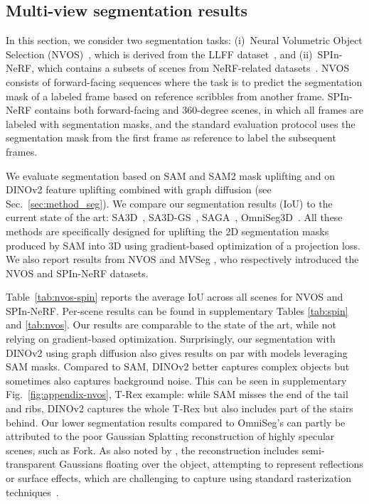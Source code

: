 \subsection{Multi-view segmentation results}
\label{sec:exp-seg}

 In this section, we consider two segmentation tasks: (i)~Neural Volumetric Object Selection (NVOS)~\cite{ren2022nvos}, which is derived from the LLFF dataset~\citep{mildenhall2019llff}, and (ii)~SPIn-NeRF, which contains a subsets of scenes from NeRF-related datasets~\citep{knapitsch2017tanks, mildenhall2019llff, mildenhall2021nerf, yen2022nerfsupervision, fridovich2022plenoxels}.
%
NVOS consists of forward-facing sequences where the task is to predict the segmentation mask of a labeled frame based on reference scribbles from another frame. 
SPIn-NeRF contains both forward-facing and 360-degree scenes, in which all frames are labeled with segmentation masks, and the standard evaluation protocol uses the segmentation mask from the first frame as reference to label the subsequent frames.

We evaluate segmentation based on SAM and SAM2 mask uplifting and on DINOv2 feature uplifting combined with graph diffusion (see Sec.~\ref{sec:method_seg}). 
%
We compare our segmentation results (IoU) to the current state of the art: SA3D~\citep{cen2023segmentNeRF}, SA3D-GS~\citep{cen2023segmentGS}, SAGA~\citep{cen2023saga}, OmniSeg3D~\citep{ying2023omniseg3d}. All these methods are specifically designed for uplifting the 2D segmentation masks produced by SAM into 3D using gradient-based optimization of a projection loss. We also report results from NVOS \citep{ren2022nvos} and MVSeg \citep{yen2022nerfsupervision}, who respectively introduced the NVOS and SPIn-NeRF datasets.

 Table~\ref{tab:nvos-spin} reports the average IoU across all scenes for NVOS and SPIn-NeRF. Per-scene results can be found in supplementary Tables \ref{tab:spin} and \ref{tab:nvos}.
Our results are comparable to the state of the art, while not relying on gradient-based optimization. 
Surprisingly, our segmentation with DINOv2 using graph diffusion also gives results on par with models leveraging SAM masks. Compared to SAM, DINOv2 better captures complex objects but sometimes also captures background noise. This can be seen in supplementary Fig.~\ref{fig:appendix-nvos}, T-Rex example: while SAM misses the end of the tail and ribs, DINOv2 captures the whole T-Rex but also includes part of the stairs behind.
Our lower segmentation results compared to OmniSeg's can partly be attributed to the poor Gaussian Splatting reconstruction of highly specular scenes, such as Fork. As also noted by \cite{cen2023saga}, the reconstruction includes semi-transparent Gaussians floating over the object, attempting to represent reflections or surface effects, which are challenging to capture using standard rasterization techniques~\citep{jiang2024gaussianshader}.


